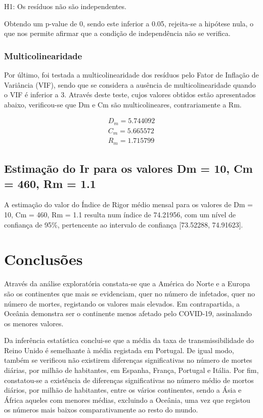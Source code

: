 \documentclass[conference]{IEEEtran}
\begin{document}
H1: Os resíduos não são independentes.

Obtendo um p-value de 0, sendo este inferior a 0.05, rejeita-se a hipótese nula, o que nos permite afirmar que a condição de independência não se verifica.

\subsubsection{Multicolinearidade} 
Por último, foi testada a multicolinearidade dos resíduos pelo Fator de Inflação de Variância (VIF), sendo que se considera a ausência de multicolinearidade quando o VIF é inferior a 3. Através deste teste, cujos valores obtidos estão apresentados abaixo, verificou-se que Dm e Cm são multicolineares, contrariamente a Rm.

\begin{equation}
\begin{array}{l}
	D_{m}=5.744092 \\
	C_{m}=5.665572 \\
	R_{m}=1.715799
\end{array}
\end{equation}


\subsection{Estimação do Ir para os valores Dm = 10, Cm = 460, Rm = 1.1}
A estimação do valor do Índice de Rigor médio mensal para os valores de Dm = 10, Cm = 460, Rm = 1.1 resulta num índice de 74.21956, com um nível de confiança de 95\%, pertencente ao intervalo de confiança [73.52288, 74.91623].


\section{Conclusões} %
Através da análise exploratória constata-se que a América do Norte e a Europa são os continentes que mais se evidenciam, quer no número de infetados, quer no número de mortes, registando os valores mais elevados. Em contrapartida, a Oceânia demonstra ser o continente menos afetado pelo COVID-19, assinalando os menores valores.

Da inferência estatística conclui-se que a média da taxa de transmissibilidade do Reino Unido é semelhante à média registada em Portugal. De igual modo, também se verificou não existirem diferenças significativas no número de mortes diárias, por milhão de habitantes, em Espanha, França, Portugal e Itália. Por fim, constatou-se a existência de diferenças significativas no número médio de mortos diários, por milhão de habitantes, entre os vários continentes, sendo a Ásia e África aqueles com menores médias, excluindo a Oceânia, uma vez que registou os números mais baixos comparativamente ao resto do mundo.
\end{document}
